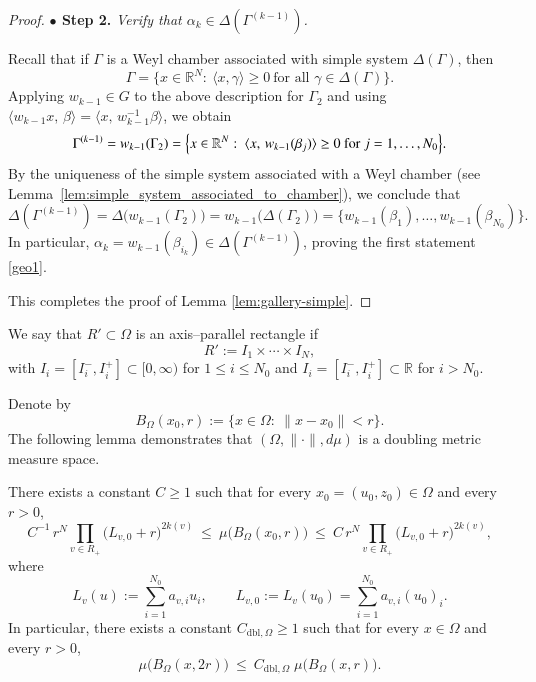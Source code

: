 \documentclass[12pt]{amsart}
\begin{document}
\begin{proof}
{\bf $\bullet$ Step 2.} {\it Verify that $\alpha_k\in\Delta(\Gamma^{(k-1)})$.}

Recall that if $\Gamma$ is a Weyl chamber associated with simple system $\Delta(\Gamma)$, then
\[
\Gamma=\{x\in\mathbb R^N:\ \langle x,\gamma\rangle\ge 0\ \text{for all }\gamma\in\Delta(\Gamma)\}.
\]
Applying $w_{k-1}\in G$ to the above description for $\Gamma_2$ and using
$\langle w_{k-1}x,\,\beta\rangle=\langle x,\,w_{k-1}^{-1}\beta\rangle$, we obtain
\[
\Gamma^{(k-1)}=w_{k-1}(\Gamma_2)
=\Bigl\{x\in\mathbb R^N:\ \langle x,\,w_{k-1}(\beta_j)\rangle\ge 0\ \text{for }j=1,\ldots,N_0\Bigr\}.
\]
By the uniqueness of the simple system associated with a Weyl chamber
(see Lemma~\ref{lem:simple_system_associated_to_chamber}), we conclude that
\[
\Delta(\Gamma^{(k-1)})=\Delta\big(w_{k-1}(\Gamma_2)\big)=w_{k-1}\big(\Delta(\Gamma_2)\big)=\{w_{k-1}(\beta_1),\ldots,w_{k-1}(\beta_{N_0})\}.
\]
In particular, $\alpha_k=w_{k-1}(\beta_{i_k})\in\Delta(\Gamma^{(k-1)})$, proving the first statement \eqref{geo1}.

This completes the proof of Lemma \ref{lem:gallery-simple}.
\end{proof}


\begin{definition}
We say that $R'\subset\Omega$ is an axis--parallel rectangle if
\[
R' := I_1\times\cdots\times I_N,
\]
with $I_i=[I_i^-,I_i^+]\subset[0,\infty)$ for $1\le i\le N_{0}$ and $I_i=[I_i^-,I_i^+]\subset\mathbb{R}$ for $i>N_{0}$.
\end{definition}

Denote by
$$B_\Omega(x_0,r):=\{x\in\Omega:\ \|x-x_0\|<r\}.$$
The following lemma demonstrates that $(\Omega,\|\cdot\|,d\mu)$ is a doubling metric measure space.
\begin{lemma}\label{lem:ball-2sided-N}
There exists a constant $C\ge 1$ such that
for every $x_0=(u_0,z_0)\in\Omega$ and every $r>0$,
\begin{equation}\label{eq:ball-2sided-Omega}
C^{-1}\,r^N\prod_{v\in R_+}\Big(L_{v,0}+r\Big)^{2k(v)}
\ \le\
\mu\big(B_\Omega(x_0,r)\big)
\ \le\
C\,r^N\prod_{v\in R_+}\Big(L_{v,0}+r\Big)^{2k(v)},
\end{equation}
where
\[
L_v(u):=\sum_{i=1}^{N_{0}} a_{v,i}u_i,
\qquad
L_{v,0}:=L_v(u_0)=\sum_{i=1}^{N_{0}} a_{v,i}(u_0)_i.
\]
In particular, there exists a constant $C_{\mathrm{dbl},\Omega}\geq 1$ such that for every $x\in\Omega$ and every $r>0$,
\[
\mu\big(B_\Omega(x,2r)\big)\ \le\ C_{\mathrm{dbl},\Omega}\;\mu\big(B_\Omega(x,r)\big).
\]
\end{lemma}
\end{document}
